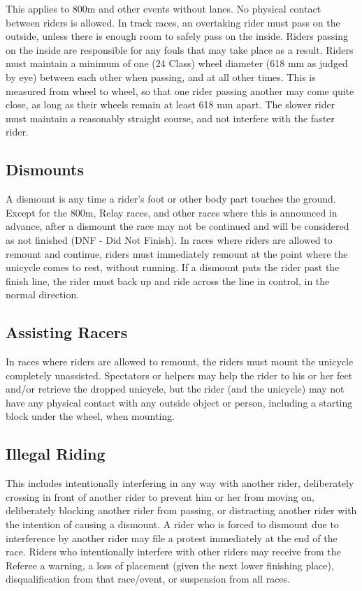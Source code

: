 This applies to 800m and other events without lanes.
No physical contact between riders is allowed.
In track races, an overtaking rider must pass on the outside, unless there is enough room to safely pass on the inside.
Riders passing on the inside are responsible for any fouls that may take place as a result.
Riders must maintain a minimum of one (24 Class) wheel diameter (618 mm as judged by eye) between each other when passing, and at all other times.
This is measured from wheel to wheel, so that one rider passing another may come quite close, as long as their wheels remain at least 618 mm apart.
The slower rider must maintain a reasonably straight course, and not interfere with the faster rider.

\subsection{Dismounts}

A dismount is any time a rider's foot or other body part touches the ground.
Except for the 800m, Relay races, and other races where this is announced in advance, after a dismount the race may not be continued and will be considered as not finished (DNF - Did Not Finish).
In races where riders are allowed to remount and continue, riders must immediately remount at the point where the unicycle comes to rest, without running.
If a dismount puts the rider past the finish line, the rider must back up and ride across the line in control, in the normal direction.

\subsection{Assisting Racers}

In races where riders are allowed to remount, the riders must mount the unicycle completely unassisted.
Spectators or helpers may help the rider to his or her feet and/or retrieve the dropped unicycle, but the rider (and the unicycle) may not have any physical contact with any outside object or person, including a starting block under the wheel, when mounting.

\subsection{Illegal Riding}

This includes intentionally interfering in any way with another rider, deliberately crossing in front of another rider to prevent him or her from moving on, deliberately blocking another rider from passing, or distracting another rider with the intention of causing a dismount.
A rider who is forced to dismount due to interference by another rider may file a protest immediately at the end of the race.
Riders who intentionally interfere with other riders may receive from the Referee a warning, a loss of placement (given the next lower finishing place), disqualification from that race/event, or suspension from all races.

